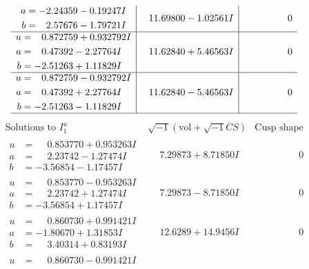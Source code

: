\documentclass[1p]{elsarticle_modified}
\theoremstyle{definition}
\newcommand{\I}{\sqrt{-1}}
\begin{document}
$$\begin{array}{c|c|c}
\begin{aligned}
a &= -2.24359 - 0.19247 I \\
b &= \phantom{-}2.57676 - 1.79721 I\end{aligned}
 & \phantom{-}11.69800 - 1.02561 I & \phantom{-0.000000 } 0 \\ \hline\begin{aligned}
u &= \phantom{-}0.872759 + 0.932792 I \\
a &= \phantom{-}0.47392 - 2.27764 I \\
b &= -2.51263 + 1.11829 I\end{aligned}
 & \phantom{-}11.62840 + 5.46563 I & \phantom{-0.000000 } 0 \\ \hline\begin{aligned}
u &= \phantom{-}0.872759 - 0.932792 I \\
a &= \phantom{-}0.47392 + 2.27764 I \\
b &= -2.51263 - 1.11829 I\end{aligned}
 & \phantom{-}11.62840 - 5.46563 I & \phantom{-0.000000 } 0\\
 \hline 
 \end{array}$$\newpage$$\begin{array}{c|c|c}  
\text{Solutions to }I^u_{1}& \I (\text{vol} + \sqrt{-1}CS) & \text{Cusp shape}\\
 \hline 
\begin{aligned}
u &= \phantom{-}0.853770 + 0.953263 I \\
a &= \phantom{-}2.23742 - 1.27474 I \\
b &= -3.56854 - 1.17457 I\end{aligned}
 & \phantom{-}7.29873 + 8.71850 I & \phantom{-0.000000 } 0 \\ \hline\begin{aligned}
u &= \phantom{-}0.853770 - 0.953263 I \\
a &= \phantom{-}2.23742 + 1.27474 I \\
b &= -3.56854 + 1.17457 I\end{aligned}
 & \phantom{-}7.29873 - 8.71850 I & \phantom{-0.000000 } 0 \\ \hline\begin{aligned}
u &= \phantom{-}0.860730 + 0.991421 I \\
a &= -1.80670 + 1.31853 I \\
b &= \phantom{-}3.40314 + 0.83193 I\end{aligned}
 & \phantom{-}12.6289 + 14.9456 I & \phantom{-0.000000 } 0 \\ \hline\begin{aligned}
u &= \phantom{-}0.860730 - 0.991421 I \\

\end{aligned}
\end{array}$$
\end{document}
